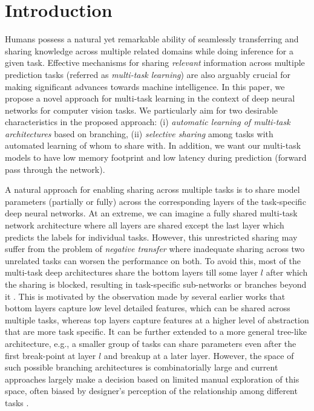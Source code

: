 \documentclass[10pt,twocolumn,letterpaper]{article}
\begin{document}
\vspace{-0.2in}
\section{Introduction}


Humans possess a natural yet remarkable ability of seamlessly transferring and sharing knowledge 
across multiple related domains while doing inference for a given task. Effective mechanisms 
for sharing \emph{relevant} information across multiple prediction tasks (referred as \emph{multi-task learning}) 
are also arguably crucial for making significant advances towards machine intelligence. 
In this paper, we
propose a novel approach for multi-task learning in the context of deep neural networks for computer vision tasks. 
We particularly aim for two desirable characteristics in the proposed approach: 
(i) \emph{automatic learning of multi-task architectures} based on branching,
(ii) \emph{selective sharing} among tasks with automated learning of whom to share with.
In addition, we want our multi-task models to have low memory footprint and low latency during prediction (forward pass through the network). 

A natural approach for enabling sharing across multiple tasks is to share model parameters (partially or fully) across 
the corresponding layers of the task-specific deep neural networks. At an extreme, we can imagine 
a fully shared multi-task network architecture where all layers are shared except the last layer 
which predicts the labels for individual tasks. However, this unrestricted
sharing may suffer from the problem of \emph{negative transfer} where inadequate sharing across 
two unrelated tasks can worsen the performance on both. To avoid this, most of the multi-task
deep architectures share the bottom layers till some layer $l$ after which the sharing is blocked, 
resulting in task-specific sub-networks or branches beyond it \cite{HyperFace16,Brendan16,huang2015cross}. 
This is motivated by the observation made by several earlier works that bottom layers capture 
low level detailed features, which can be shared across multiple tasks, whereas top
layers capture features at a higher level of abstraction that are more task specific.
It can be further extended to a more general tree-like architecture, e.g., a smaller group of tasks can share 
parameters even after the first break-point at layer $l$ and breakup at a later layer.   
However, the space of such possible branching architectures is combinatorially large and current approaches 
largely make a decision based on limited manual exploration of this space, often biased by designer's perception of the 
relationship among different tasks \cite{Misra16}.
\end{document}
